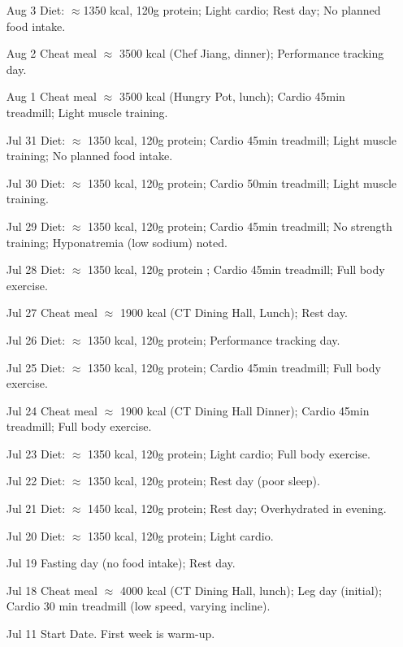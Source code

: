 \documentclass{article}
\begin{document}
\begin{itemize}
\item [Aug 3] Diet: $\approx$1350 kcal, 120g protein; Light cardio; Rest day; No planned food intake.
\item [Aug 2] Cheat meal $\approx$ 3500 kcal (Chef Jiang, dinner); Performance tracking day.
\item [Aug 1] Cheat meal $\approx$ 3500 kcal (Hungry Pot, lunch); Cardio 45min treadmill; Light muscle training.
\item [Jul 31] Diet: $\approx$ 1350 kcal, 120g protein; Cardio 45min treadmill; Light muscle training; No planned food intake.
\item [Jul 30] Diet: $\approx$ 1350 kcal, 120g protein; Cardio 50min treadmill; Light muscle training.
\item [Jul 29] Diet: $\approx$ 1350 kcal, 120g protein; Cardio 45min treadmill; No strength training; Hyponatremia (low sodium) noted.
\item [Jul 28] Diet: $\approx$ 1350 kcal, 120g protein ; Cardio 45min treadmill; Full body exercise.
\item [Jul 27] Cheat meal $\approx$ 1900 kcal (CT Dining Hall, Lunch); Rest day.
\item [Jul 26] Diet: $\approx$ 1350 kcal, 120g protein; Performance tracking day.
\item [Jul 25] Diet: $\approx$ 1350 kcal, 120g protein; Cardio 45min treadmill; Full body exercise.
\item [Jul 24] Cheat meal $\approx$ 1900 kcal (CT Dining Hall Dinner); Cardio 45min treadmill; Full body exercise.
\item [Jul 23] Diet: $\approx$ 1350 kcal, 120g protein; Light cardio; Full body exercise.
\item [Jul 22] Diet: $\approx$ 1350 kcal, 120g protein; Rest day (poor sleep).
\item [Jul 21] Diet: $\approx$ 1450 kcal, 120g protein; Rest day; Overhydrated in evening.
\item [Jul 20] Diet: $\approx$ 1350 kcal, 120g protein; Light cardio.
\item [Jul 19] Fasting day (no food intake); Rest day.
\item [Jul 18] Cheat meal $\approx$ 4000 kcal (CT Dining Hall, lunch); Leg day (initial); Cardio 30 min treadmill (low speed, varying incline).
\item [Jul 11] Start Date. First week is warm-up.
\end{itemize}
\end{document}
